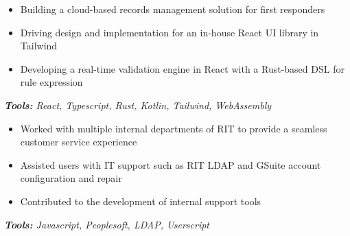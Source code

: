 \begin{itemize}
  \item Building a cloud-based records management solution for first responders
  \item Driving design and implementation for an in-house React UI library in Tailwind
  \item Developing a real-time validation engine in React with a Rust-based DSL for rule expression
\end{itemize}
\textit{\textbf{Tools:} React, Typescript, Rust, Kotlin, Tailwind, WebAssembly}

\divider

\begin{itemize}
  \item Worked with multiple internal departments of RIT to provide a seamless customer service experience
  \item Assisted users with IT support such as RIT LDAP and GSuite account configuration and repair
  \item Contributed to the development of internal support tools
\end{itemize}
\textit{\textbf{Tools:} Javascript, Peoplesoft, LDAP, Userscript}